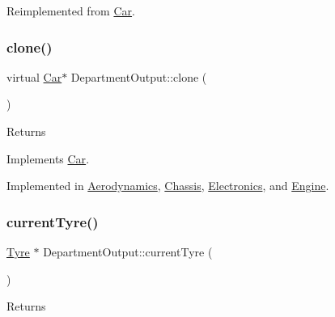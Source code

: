 Reimplemented from \hyperlink{classCar_aadb72568edbdf571547ec48e9781237f}{Car}.

\mbox{\label{classDepartmentOutput_ab20c9d559bca6ce8e6748dfac47c3f84}} 
\subsubsection{\texorpdfstring{clone()}{clone()}}
{\footnotesize\ttfamily virtual \hyperlink{classCar}{Car}$\ast$ Department\+Output\+::clone (\begin{DoxyParamCaption}{ }\end{DoxyParamCaption})\hspace{0.3cm}{\ttfamily [pure virtual]}}

\begin{DoxyReturn}{Returns}

\end{DoxyReturn}


Implements \hyperlink{classCar_a5a54bbfe8e72022f4d9fdf6ecc990d99}{Car}.



Implemented in \hyperlink{classAerodynamics_abbd7bb0e8186e3d86b8baf7a72aeb63e}{Aerodynamics}, \hyperlink{classChassis_a2700ee5437760643c7cad46e077dcbcd}{Chassis}, \hyperlink{classElectronics_a292164aedff12771f4f05af648a9fc70}{Electronics}, and \hyperlink{classEngine_a18a3b9d950e67a868420b79890ba1428}{Engine}.

\mbox{\label{classDepartmentOutput_aca95508fd9145baea4e7a32448fa653b}} 
\subsubsection{\texorpdfstring{current\+Tyre()}{currentTyre()}}
{\footnotesize\ttfamily \hyperlink{classTyre}{Tyre} $\ast$ Department\+Output\+::current\+Tyre (\begin{DoxyParamCaption}{ }\end{DoxyParamCaption})\hspace{0.3cm}{\ttfamily [virtual]}}

\begin{DoxyReturn}{Returns}

\end{DoxyReturn}


